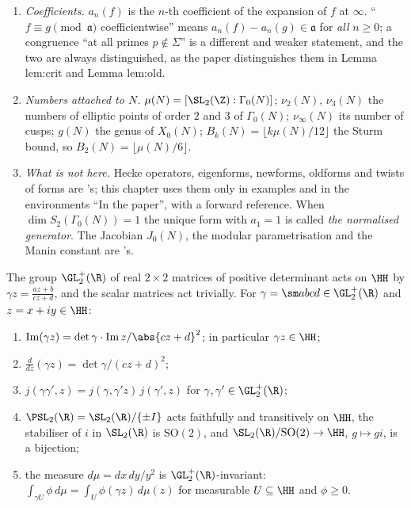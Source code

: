 \begin{convention}
\begin{enumerate}[label=(\alph*)]
variable (, , , B-C8).
\item \emph{Coefficients.} $a_n(f)$ is the $n$-th coefficient of the expansion of $f$ at $\infty$. ``$f\equiv g\pmod{\mathfrak a}$ coefficientwise'' means
$a_n(f)-a_n(g)\in\mathfrak a$ for \emph{all} $n\ge0$; a congruence ``at all primes $p\notin\Sigma$'' is a different and weaker statement,
and the two are always distinguished, as the paper distinguishes them in Lemma lem:crit and Lemma lem:old.
\item \emph{Numbers attached to $N$.} $\mu(N)=[\SL_2(\Z):\Gamma_0(N)]$; $\nu_2(N)$, $\nu_3(N)$ the numbers of elliptic points of order $2$ and
$3$ of $\Gamma_0(N)$; $\nu_\infty(N)$ its number of cusps; $g(N)$ the genus of $X_0(N)$; $B_k(N)=\lfloor k\mu(N)/12\rfloor$ the Sturm bound, so
$B_2(N)=\lfloor\mu(N)/6\rfloor$.
\item \emph{What is not here.} Hecke operators, eigenforms, newforms, oldforms and twists of forms are 's; this chapter
uses them only in examples and in the environments ``In the paper'', with a forward reference. When $\dim S_2(\Gamma_0(N))=1$ the
unique form with $a_1=1$ is called \emph{the normalised generator}. The Jacobian $J_0(N)$, the modular parametrisation and the
Manin constant are 's.
\end{enumerate}
\end{convention}

\begin{proposition}\label{prop:modforms:upper-half-plane}
The group $\GL_2^+(\R)$ of real $2\times2$ matrices of positive determinant acts on $\HH$ by $\gamma z=\frac{az+b}{cz+d}$, and the scalar matrices act
trivially. For $\gamma=\sm abcd\in\GL_2^+(\R)$ and $z=x+iy\in\HH$:
\begin{enumerate}[label=(\roman*)]
\item $\operatorname{Im}(\gamma z)=\det\gamma\cdot\operatorname{Im}z/\abs{cz+d}^2$; in particular $\gamma z\in\HH$;
\item $\frac{d}{dz}(\gamma z)=\det\gamma/(cz+d)^2$;
\item $j(\gamma\gamma',z)=j(\gamma,\gamma'z)\,j(\gamma',z)$ for $\gamma,\gamma'\in\GL_2^+(\R)$;
\item $\PSL_2(\R)=\SL_2(\R)/\{\pm I\}$ acts faithfully and transitively on $\HH$, the stabiliser of $i$ in $\SL_2(\R)$ is $\mathrm{SO}(2)$, and
$\SL_2(\R)/\mathrm{SO}(2)\to\HH$, $g\mapsto gi$, is a bijection;
\item the measure $d\mu=dx\,dy/y^2$ is $\GL_2^+(\R)$-invariant: $\int_{\gamma U}\phi\,d\mu=\int_U\phi(\gamma z)\,d\mu(z)$ for measurable $U\subseteq\HH$ and $\phi\ge0$.
\end{enumerate}
\end{proposition}

